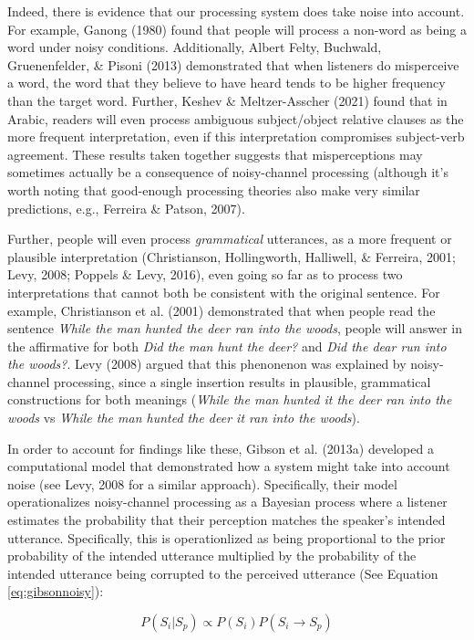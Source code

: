 \documentclass[10pt, letterpaper]{article}
\begin{document}
Indeed, there is evidence that our processing system does take noise
into account. For example, Ganong (1980) found that people will process
a non-word as being a word under noisy conditions. Additionally, Albert
Felty, Buchwald, Gruenenfelder, \& Pisoni (2013) demonstrated that when
listeners do misperceive a word, the word that they believe to have
heard tends to be higher frequency than the target word. Further, Keshev
\& Meltzer-Asscher (2021) found that in Arabic, readers will even
process ambiguous subject/object relative clauses as the more frequent
interpretation, even if this interpretation compromises subject-verb
agreement. These results taken together suggests that misperceptions may
sometimes actually be a consequence of noisy-channel processing
(although it's worth noting that good-enough processing theories also
make very similar predictions, e.g., Ferreira \& Patson, 2007).

Further, people will even process \emph{grammatical} utterances, as a
more frequent or plausible interpretation (Christianson, Hollingworth,
Halliwell, \& Ferreira, 2001; Levy, 2008; Poppels \& Levy, 2016), even
going so far as to process two interpretations that cannot both be
consistent with the original sentence. For example, Christianson et al.
(2001) demonstrated that when people read the sentence \emph{While the
man hunted the deer ran into the woods}, people will answer in the
affirmative for both \emph{Did the man hunt the deer?} and \emph{Did the
dear run into the woods?}. Levy (2008) argued that this phenonenon was
explained by noisy-channel processing, since a single insertion results
in plausible, grammatical constructions for both meanings (\emph{While
the man hunted it the deer ran into the woods} vs \emph{While the man
hunted the deer it ran into the woods}).

In order to account for findings like these, Gibson et al. (2013a)
developed a computational model that demonstrated how a system might
take into account noise (see Levy, 2008 for a similar approach).
Specifically, their model operationalizes noisy-channel processing as a
Bayesian process where a listener estimates the probability that their
perception matches the speaker's intended utterance. Specifically, this
is operationlized as being proportional to the prior probability of the
intended utterance multiplied by the probability of the intended
utterance being corrupted to the perceived utterance (See Equation
\ref{eq:gibsonnoisy}):

\begin{equation}
\label{eq:gibsonnoisy}
P(S_i|S_p) \propto P(S_i) P(S_i \to S_p)
\end{equation}
\end{document}
